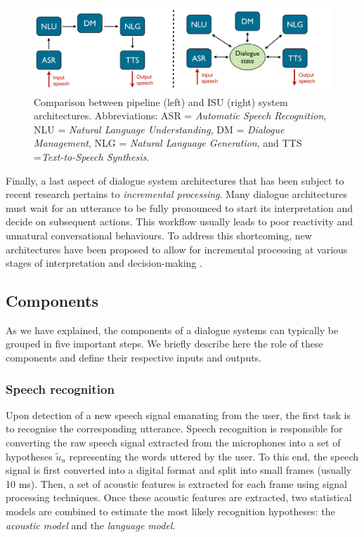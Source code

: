  \begin{figure}[h!]
\centering
\includegraphics[scale=0.28]{imgs/architecture_comparison.pdf}
\caption{Comparison between pipeline (left) and ISU (right) system architectures.  Abbreviations: ASR = \textit{Automatic Speech Recognition}, NLU = \textit{Natural Language Understanding}, DM = \textit{Dialogue Management}, NLG = \textit{Natural Language Generation}, and TTS =\textit{Text-to-Speech Synthesis}.}
\label{fig:architecture_comp}
\end{figure}

Finally, a last aspect of dialogue system architectures that has been subject to recent research pertains to \textit{incremental processing}.  Many dialogue architectures must wait for an utterance to be fully pronounced to start its interpretation and decide on subsequent actions.  This workflow usually leads to poor reactivity and unnatural conversational behaviours.  To address this shortcoming, new architectures have been proposed to allow for incremental processing at various stages of interpretation and decision-making \citep{schlangen2009general}.


\subsection{Components}

As we have explained, the components of a dialogue systems can typically be grouped in five important steps.  We briefly describe here the role of these components and define their respective inputs and outputs.

\subsubsection*{Speech recognition}
Upon detection of a new speech signal emanating from the user, the first task is to recognise the corresponding utterance. Speech recognition is responsible for converting the raw speech signal extracted from the microphones into a set of hypotheses $\tilde{u}_u$ representing the words uttered by the user. To this end, the speech signal is first converted into a digital format and split into small frames (usually 10 ms). Then, a set of acoustic features is extracted for each frame using signal processing techniques.  Once these acoustic features are extracted, two statistical models are combined to estimate the most likely recognition hypotheses: the \textit{acoustic model} and the \textit{language model}.  

